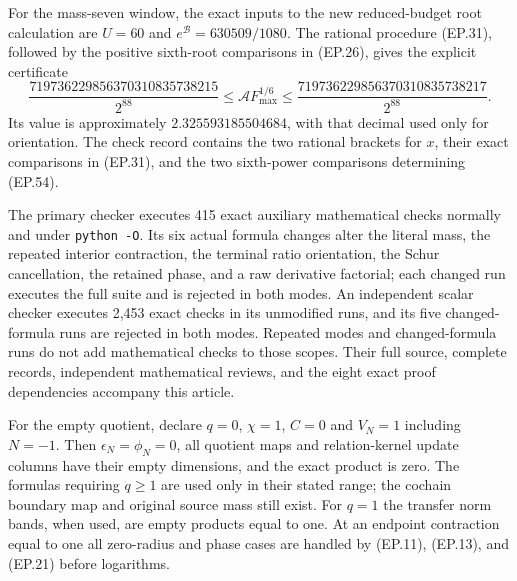 \documentclass[11pt]{article}
\begin{document}
For the mass-seven window, the exact inputs to the new reduced-budget
root calculation are $U=60$ and $e^{\mathcal B}=630509/1080$.
The rational procedure (EP.31), followed by the positive sixth-root
comparisons in (EP.26), gives the explicit certificate
\[
 \frac{719736229856370310835738215}{2^{88}}
 \le\mathcal A F_{\max}^{1/6}\le
 \frac{719736229856370310835738217}{2^{88}}.\tag{EP.54}
\]
Its value is approximately $2.325593185504684$, with that decimal
used only for orientation. The check record contains the two rational
brackets for $x$, their exact comparisons in (EP.31), and the two
sixth-power comparisons determining (EP.54).

The primary checker executes 415 exact auxiliary mathematical checks
normally and under \texttt{python -O}. Its six actual formula changes
alter the literal mass, the repeated interior contraction, the terminal
ratio orientation, the Schur cancellation, the retained phase, and a
raw derivative factorial; each changed run executes the full suite and
is rejected in both modes. An independent scalar checker executes
2,453 exact checks in its unmodified runs, and its five changed-formula
runs are rejected in both modes. Repeated modes and changed-formula
runs do not add mathematical checks to those scopes. Their full source,
complete records, independent mathematical reviews, and the eight exact
proof dependencies accompany this article.

For the empty quotient, declare $q=0$, $\chi=1$, $C=0$ and
$V_N=1$ including $N=-1$. Then $\epsilon_N=\phi_N=0$,
all quotient maps and relation-kernel update columns have their empty
dimensions, and the exact product is zero. The formulas requiring
$q\ge1$ are used only in their stated range; the cochain boundary
map and original source mass still exist. For $q=1$ the transfer
norm bands, when used, are empty products equal to one. At an
endpoint contraction equal to one all zero-radius and phase cases
are handled by (EP.11), (EP.13), and (EP.21) before logarithms.
\end{document}

